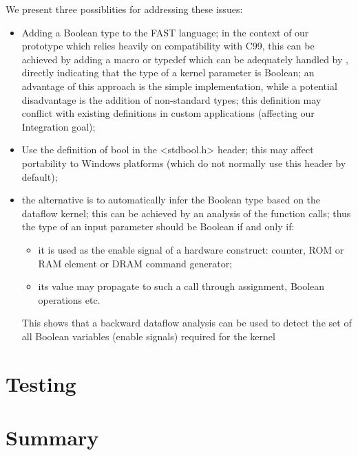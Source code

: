 We present three possiblities for addressing these issues:
\begin{itemize}
\item Adding a Boolean type to the FAST language; in the context of
  our prototype which relies heavily on compatibility with C99, this
  can be achieved by adding a macro or typedef which can be adequately
  handled by \fastc{}, directly indicating that the type of a kernel
  parameter is Boolean; an advantage of this approach is the simple
  implementation, while a potential disadvantage is the addition of
  non-standard types; this definition may  conflict with existing definitions
  in custom applications (affecting our Integration goal);

\item Use the definition of bool in the <stdbool.h> header; this may
  affect portability to Windows platforms (which do not normally use
  this header by default);

\item the alternative is to automatically infer the Boolean type based
  on the dataflow kernel; this can be achieved by an analysis of the
  function calls; thus the type of an input parameter should be
  Boolean if and only if:
  \begin{itemize}
  \item it is used as the enable signal of a hardware construct:
    counter, ROM or RAM element or DRAM command generator;
  \item its value may propagate to such a call through assignment,
    Boolean operations etc.
  \end{itemize}
  This shows that a backward dataflow analysis \cite{aho1977principles}\cite{cooper2011engineering}can be used to
  detect the set of all Boolean variables (enable signals) required
  for the kernel  \XXX{}
\end{itemize}


\section{Testing}

\section{Summary}